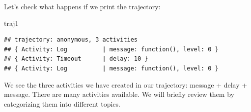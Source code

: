 \documentclass[
]{book}
\newenvironment{Shaded}{\begin{snugshade}}{\end{snugshade}}
\newcommand{\NormalTok}[1]{#1}
\theoremstyle{definition}
\theoremstyle{definition}
\theoremstyle{definition}
\theoremstyle{definition}
\theoremstyle{remark}
\begin{document}
Let's check what happens if we print the trajectory:

\begin{Shaded}
\begin{Highlighting}[]
\NormalTok{traj1}
\end{Highlighting}
\end{Shaded}

\begin{verbatim}
## trajectory: anonymous, 3 activities
## { Activity: Log          | message: function(), level: 0 }
## { Activity: Timeout      | delay: 10 }
## { Activity: Log          | message: function(), level: 0 }
\end{verbatim}

We see the three activities we have created in our trajectory: message + delay + message. There are many activities available. We will briefly review them by categorizing them into different topics.
\end{document}
